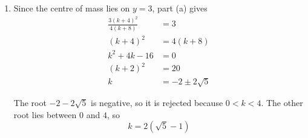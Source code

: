\documentclass[leqno]{article}
\begin{document}
\begin{enumerate}[
  label=\textbf{\arabic*.},
  leftmargin=*,
  topsep=0pt,
  partopsep=0pt,
  parsep=0pt
]
\begin{djsSolution}
\begin{enumerate}[label=\textbf{(\alph*)}, start=1]
For a uniform lamina between a curve and the \(y\)-axis, the centre of mass formulae are
\[
A=\int_a^b x\,\mathrm{d}y,
\qquad
\bar{y}=\frac{1}{A}\int_a^b xy\,\mathrm{d}y
\]

The area is therefore
\begin{align*}
A&=\int_k^4\left(4-\frac{y^2}{4}\right)\,\mathrm{d}y\\
&=\left[4y-\frac{y^3}{12}\right]_k^4\\
&=\frac{32}{3}-4k+\frac{k^3}{12}\\
&=\frac{k^3-48k+128}{12}
\end{align*}

Using the centre of mass formula:
\begin{align*}
A\bar{y}&=\int_k^4 y\left(4-\frac{y^2}{4}\right)\,\mathrm{d}y\\
&=\left[2y^2-\frac{y^4}{16}\right]_k^4\\
&=16-2k^2+\frac{k^4}{16}\\
&=\frac{(k^2-16)^2}{16}
\end{align*}

Dividing by \(A\), factorising and cancelling \((k-4)^2\), which is non-zero since \(0<k<4\), gives
\begin{align*}
\bar{y}
&=\frac{3(k^2-16)^2}{4(k^3-48k+128)}\\
&=\frac{3(k-4)^2(k+4)^2}{4(k-4)^2(k+8)}\\
&=\frac{3(k+4)^2}{4(k+8)}
\end{align*}

\item Since the centre of mass lies on \(y=3\), part (a) gives
\begin{align*}
\frac{3(k+4)^2}{4(k+8)}&=3\\
(k+4)^2&=4(k+8)\\
k^2+4k-16&=0\\
(k+2)^2&=20\\
k&=-2\pm2\sqrt{5}
\end{align*}

The root \(-2-2\sqrt{5}\) is negative, so it is rejected because \(0<k<4\). The other root lies between \(0\) and \(4\), so
\[
k=2(\sqrt{5}-1)
\]

\end{enumerate}
\end{djsSolution}

\newpage

\questionitem


\end{enumerate}
\end{document}
